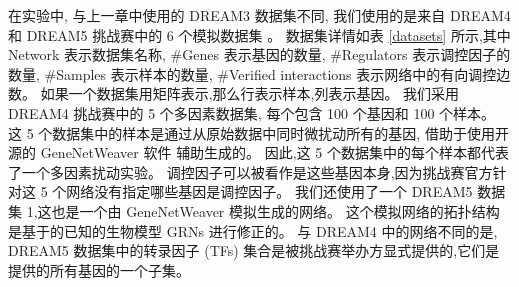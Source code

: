 在实验中, 与上一章中使用的 DREAM3 数据集不同,
我们使用的是来自 DREAM4 和 DREAM5 挑战赛中的 6 个模拟数据集 \cite{marbach2012wisdom}。
数据集详情如表 \ref{datasets} 所示,其中 Network 表示数据集名称,
\#Genes 表示基因的数量, \#Regulators 表示调控因子的数量, \#Samples 表示样本的数量, 
\#Verified interactions 表示网络中的有向调控边数。
如果一个数据集用矩阵表示,那么行表示样本,列表示基因。
我们采用 DREAM4 挑战赛中的 5 个多因素数据集,
每个包含 100 个基因和 100 个样本。
这 5 个数据集中的样本是通过从原始数据中同时微扰动所有的基因, 借助于使用开源的 GeneNetWeaver 软件 \cite{marbach2009generating} 辅助生成的。
因此,这 5 个数据集中的每个样本都代表了一个多因素扰动实验。
调控因子可以被看作是这些基因本身,因为挑战赛官方针对这 5 个网络没有指定哪些基因是调控因子。
我们还使用了一个 DREAM5 数据集 1,这也是一个由 GeneNetWeaver 模拟生成的网络。
这个模拟网络的拓扑结构是基于的已知的生物模型 GRNs 进行修正的。
与 DREAM4 中的网络不同的是,
DREAM5 数据集中的转录因子 (TFs) 集合是被挑战赛举办方显式提供的,它们是提供的所有基因的一个子集。


